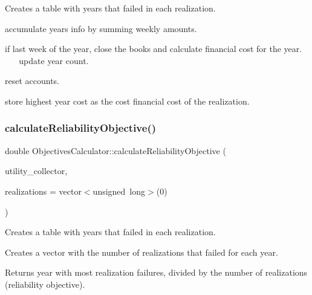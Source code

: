Creates a table with years that failed in each realization.

accumulate year\textquotesingle{}s info by summing weekly amounts.

if last week of the year, close the books and calculate financial cost for the year. ~\newline
~\newline
~\newline
 update year count.

reset accounts.

store highest year cost as the cost financial cost of the realization. \mbox{\label{classObjectivesCalculator_a4cb12f9bb7861368c999d435477593c4_a4cb12f9bb7861368c999d435477593c4}} 
\subsubsection{\texorpdfstring{calculate\+Reliability\+Objective()}{calculateReliabilityObjective()}}
{\footnotesize\ttfamily double Objectives\+Calculator\+::calculate\+Reliability\+Objective (\begin{DoxyParamCaption}\item[{const vector$<$ \mbox{\hyperlink{classUtilitiesDataCollector}{Utilities\+Data\+Collector}} $\ast$$>$ \&}]{utility\+\_\+collector,  }\item[{vector$<$ unsigned long $>$}]{realizations = {\ttfamily vector$<$unsigned~long$>$(0)} }\end{DoxyParamCaption})\hspace{0.3cm}{\ttfamily [static]}}

Creates a table with years that failed in each realization.

Creates a vector with the number of realizations that failed for each year.

Returns year with most realization failures, divided by the number of realizations (reliability objective). \mbox{\label{classObjectivesCalculator_aba30dbaf1a1520282f81c683fe00b5ed_aba30dbaf1a1520282f81c683fe00b5ed}} 
